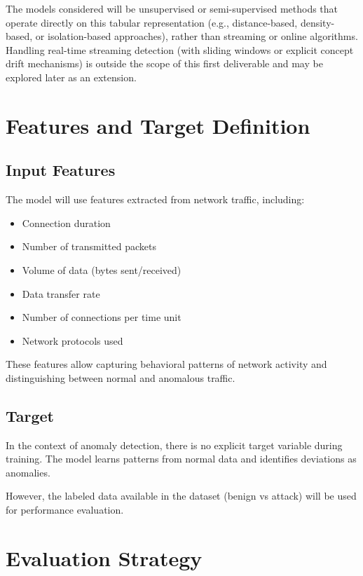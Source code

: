\documentclass[11pt]{article}
\begin{document}
The models considered will be unsupervised or semi-supervised methods that operate directly on this tabular representation (e.g., distance-based, density-based, or isolation-based approaches), rather than streaming or online algorithms. Handling real-time streaming detection (with sliding windows or explicit concept drift mechanisms) is outside the scope of this first deliverable and may be explored later as an extension.

\section{Features and Target Definition}

\subsection{Input Features}

The model will use features extracted from network traffic, including:
\begin{itemize}
    \item Connection duration
    \item Number of transmitted packets
    \item Volume of data (bytes sent/received)
    \item Data transfer rate
    \item Number of connections per time unit
    \item Network protocols used
\end{itemize}

These features allow capturing behavioral patterns of network activity and distinguishing between normal and anomalous traffic.

\subsection{Target}

In the context of anomaly detection, there is no explicit target variable during training. The model learns patterns from normal data and identifies deviations as anomalies.

However, the labeled data available in the dataset (benign vs attack) will be used for performance evaluation.

\section{Evaluation Strategy}
\end{document}
